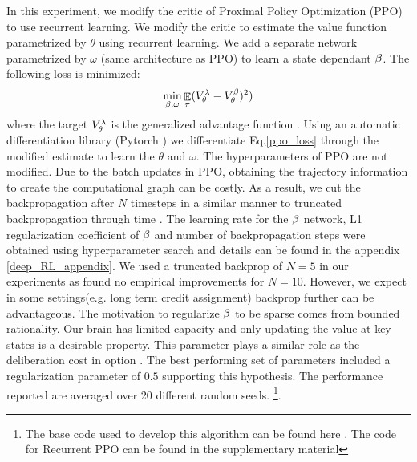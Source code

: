 In this experiment, we modify the critic of Proximal Policy Optimization (PPO)~\cite{schulman2017proximal} to use recurrent learning. We modify the critic to estimate the value function parametrized by $\theta$ using recurrent learning. We add a separate network parametrized by $\omega$ (same architecture as PPO) to learn a state dependant $\beta$. The following loss is minimized:
\begin{equation}\label{ppo_loss}
    \min_{\beta,\omega} \mathop{\mathbb{E}}_{\pi}(V_{\theta}^{\lambda}-V^{\beta}_{\theta})^2)
\end{equation}
where the target $V_{\theta}^{\lambda}$ is the generalized advantage function \cite{schulman2015high}. Using an automatic differentiation library (Pytorch \cite{paszke2017automatic}) we differentiate Eq.\ref{ppo_loss} through the modified estimate to learn the $\theta$ and $\omega$. The hyperparameters of PPO are not modified. Due to the batch updates in PPO, obtaining the trajectory information to create the computational graph can be costly. As a result, we cut the backpropagation after $N$ timesteps in a similar manner to truncated backpropagation through time \cite{williams1995gradient}. The learning rate for the $\beta$ network, L1 regularization coefficient of $\beta$ and number of backpropagation steps were obtained using hyperparameter search and details can be found in the appendix \ref{deep_RL_appendix}. We used a truncated backprop of $N=5$ in our experiments as found no empirical improvements for $N=10$. However, we expect in some settings(e.g. long term credit assignment) backprop further can be advantageous. The motivation to regularize $\beta$ to be sparse comes from bounded rationality. Our brain has limited capacity and only updating the value at key states is a desirable property. This parameter plays a similar role as the deliberation cost in option \cite{harb2018waiting}. The best performing set of parameters included a regularization parameter of $0.5$ supporting this hypothesis. The performance reported are averaged over 20 different random seeds. \footnote{The base code used to develop this algorithm can be found here \cite{pytorchrl}. The code for Recurrent PPO can be found in the supplementary material}.

